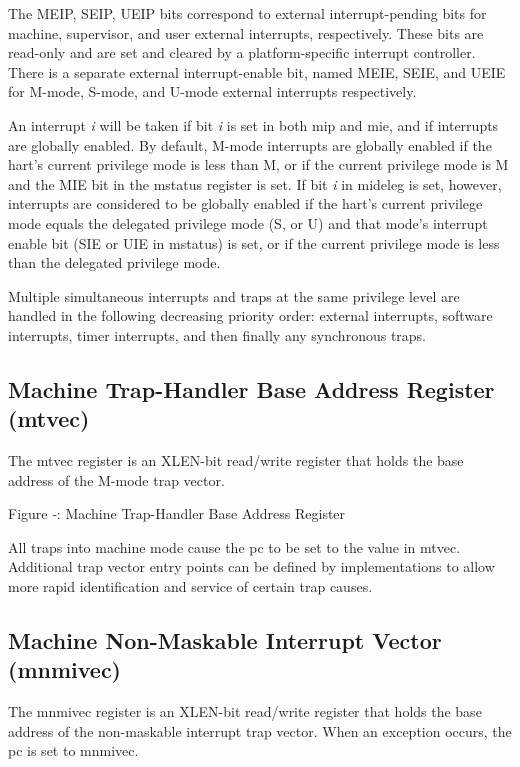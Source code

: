 The MEIP, SEIP, UEIP bits correspond to external interrupt-pending bits
for machine, supervisor, and user external interrupts, respectively.
These bits are read-only and are set and cleared by a platform-specific
interrupt controller. There is a separate external interrupt-enable bit,
named MEIE, SEIE, and UEIE for M-mode, S-mode, and U-mode external
interrupts respectively.

An interrupt \emph{i} will be taken if bit \emph{i} is set in both mip
and mie, and if interrupts are globally enabled. By default, M-mode
interrupts are globally enabled if the hart's current privilege mode is
less than M, or if the current privilege mode is M and the MIE bit in
the mstatus register is set. If bit \emph{i} in mideleg is set, however,
interrupts are considered to be globally enabled if the hart's current
privilege mode equals the delegated privilege mode (S, or U) and that
mode's interrupt enable bit (SIE or UIE in mstatus) is set, or if the
current privilege mode is less than the delegated privilege mode.

Multiple simultaneous interrupts and traps at the same privilege level
are handled in the following decreasing priority order: external
interrupts, software interrupts, timer interrupts, and then finally any
synchronous traps.

\subsection{Machine Trap-Handler Base Address Register
(mtvec)}\label{machine-trap-handler-base-address-register-mtvec}

The mtvec register is an XLEN-bit read/write register that holds the
base address of the M-mode trap vector.

\missingfigure{}

Figure ‑: Machine Trap-Handler Base Address Register

All traps into machine mode cause the pc to be set to the value in
mtvec. Additional trap vector entry points can be defined by
implementations to allow more rapid identification and service of
certain trap causes.

\subsection{Machine Non-Maskable Interrupt Vector
(mnmivec)}\label{machine-non-maskable-interrupt-vector-mnmivec}

The mnmivec register is an XLEN-bit read/write register that holds the
base address of the non-maskable interrupt trap vector. When an
exception occurs, the pc is set to mnmivec.

